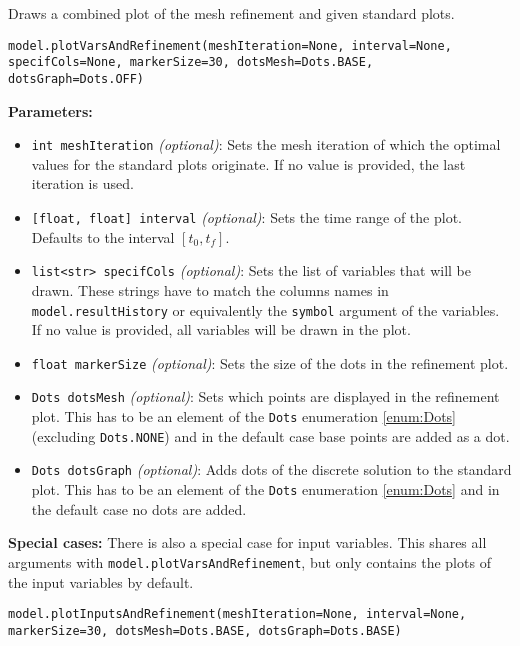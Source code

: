 \documentclass[12pt]{article}
\begin{document}
\begin{mdframed}[backgroundcolor=gray!10, roundcorner=10pt,
		linewidth=1pt]

	Draws a combined plot of the mesh refinement and given standard plots.

	\begin{lstlisting}
model.plotVarsAndRefinement(meshIteration=None, interval=None, specifCols=None, markerSize=30, dotsMesh=Dots.BASE, dotsGraph=Dots.OFF)
		\end{lstlisting}
	\label{plotVarsAndRefinement}
	\textbf{Parameters:}
	\begin{itemize}
		\item \texttt{int meshIteration} \emph{(optional)}: Sets the
		      mesh iteration of which the optimal values for the standard plots originate. If
		      no value is provided, the last iteration is used.

		\item \texttt{[float, float] interval} \emph{(optional)}: Sets
		      the time range of the plot. Defaults to the interval $[t_0, t_f]$.

		\item \texttt{list<str> specifCols} \emph{(optional)}: Sets the
		      list of variables that will be drawn. These strings have to match the columns
		      names in \texttt{model.resultHistory} or equivalently the \texttt{symbol}
		      argument of the variables. If no value is provided, all variables will be drawn
		      in the plot.

		\item \texttt{float markerSize} \emph{(optional)}: Sets the
		      size of the dots in the refinement plot.

		\item \texttt{Dots dotsMesh} \emph{(optional)}: Sets which
		      points are displayed in the refinement plot. This has to be an element of the
		      \texttt{Dots} enumeration \eqref{enum:Dots} (excluding \texttt{Dots.NONE}) and
		      in the default case base points are added as a dot.

		\item \texttt{Dots dotsGraph} \emph{(optional)}: Adds dots of
		      the discrete solution to the standard plot. This has to be an element of the
		      \texttt{Dots} enumeration \eqref{enum:Dots} and in the default case no dots are
		      added.
	\end{itemize}

	\textbf{Special cases:}
	There is also a special case for input variables. This shares
	all arguments with \texttt{model.plotVarsAndRefinement}, but only contains the
	plots of the input variables by default.
	\begin{lstlisting}
model.plotInputsAndRefinement(meshIteration=None, interval=None, markerSize=30, dotsMesh=Dots.BASE, dotsGraph=Dots.BASE)    
		\end{lstlisting}


\end{mdframed}
\end{document}
